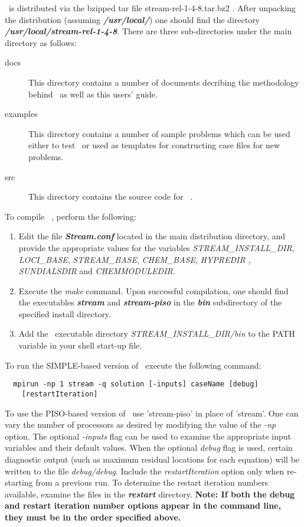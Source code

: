 \documentclass{article}
\begin{document}
\Stream\ is distributed via the bzipped tar file stream-rel-1-4-8.tar.bz2 .
After unpacking the
distribution (assuming \emph{\bf /usr/local/}) one should find the
directory \emph{\bf /usr/local/stream-rel-1-4-8}. There are three
sub-directories under the main directory as follows:
\begin{description}
  \item[docs] This directory contains a number of documents decribing the
methodology behind \Stream\ as well as this users' guide.
  \item[examples] This directory contains a number of sample problems which
can be used either to test \Stream\ or used as templates for constructing case
files for new problems.
  \item[src] This directory contains the source code for \Stream\ .
\end{description}
To compile \Stream\ , perform the following:
\begin{enumerate}
  \item Edit the file \emph{\bf Stream.conf} located in the main distribution
directory, and provide the appropriate values for the variables
\emph{STREAM\_INSTALL\_DIR}, \emph{LOCI\_BASE},
\emph{STREAM\_BASE}, \emph{CHEM\_BASE}, \emph{HYPREDIR} , \emph{SUNDIALSDIR}
and \emph{CHEMMODULEDIR}.
  \item Execute the \emph{make} command. Upon successful compilation, one should
find the executables \emph{\bf stream} and \emph{\bf stream-piso} in 
the \emph{\bf bin} subdirectory of the specified install directory.
  \item Add the \Stream\ executable directory \emph{STREAM\_INSTALL\_DIR/bin} to
the PATH variable in your shell start-up file.
\end{enumerate}
To run the SIMPLE-based version of \Stream\, execute the following command:
\begin{verbatim}
  mpirun -np 1 stream -q solution [-inputs] caseName [debug]
    [restartIteration]
\end{verbatim}

To use the PISO-based version of \Stream\, use 'stream-piso' in place of 'stream'.
One can vary the number of processors as desired by modifying the value of
the \emph{-np} option. The optional \emph{-inputs} flag can be used to
examine the appropriate input variables and their default values. When the
optional \emph{debug} flag is used, certain
diagnostic output (such as maximum residual locations for each equation) will
be written to the file \emph{debug/debug}. Include the \emph{restartIteration}
option only when re-starting from a previous run. To determine the restart
iteration numbers available, examine the files in the \emph{\bf restart}
directory. \textbf {Note: If both the debug and restart iteration number options
appear in the command line, they must be in the order specified above.}
\end{document}
